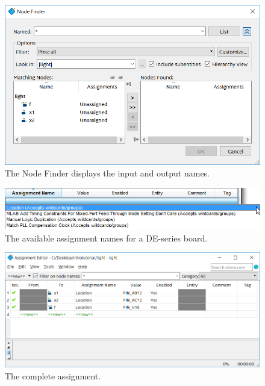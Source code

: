 \documentclass[11pt, twoside, pdftex]{article}
\begin{document}
\begin{figure}[H]
   \begin{center}
      \includegraphics[scale=0.65]{figures/figure25.png}
   \caption{The Node Finder displays the input and output names.} 
	 \label{fig:25}
	 \end{center}
\end{figure}

\begin{figure}[H]
   \begin{center}
      \includegraphics[scale=0.65]{figures/figure26.png}
   \caption{The available assignment names for a DE-series board.} 
	 \label{fig:26}
	 \end{center}
\end{figure}

\begin{figure}[H]
   \begin{center}
      \includegraphics[scale=0.6]{figures/figure27.png}
   \caption{The complete assignment.} 
	 \label{fig:27}
	 \end{center}
\end{figure}
\end{document}
